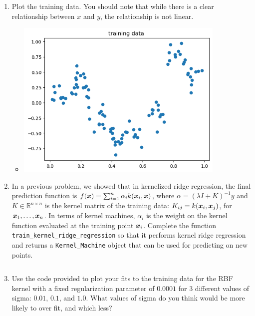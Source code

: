\documentclass{article}
\theoremstyle{plain}
\theoremstyle{definition}
\begin{document}
\begin{enumerate}
  \setcounter{enumi}{\value{saveenum}}
\item Plot the training data. You should note that while there is a clear
relationship between $x$ and $y$, the relationship is not linear.
\begin{itemize}
    \color{blue}
    \item \includegraphics[width=10cm]{homework/homework_3/immages/question_25_1.png}
\end{itemize}

\item In a previous problem, we showed that in kernelized ridge regression,
the final prediction function is $f(\boldsymbol{x})=\sum_{i=1}^{n}\alpha_{i}k(\boldsymbol{x}_{i},\boldsymbol{x})$,
where $\alpha=(\lambda I+K)^{-1}y$ and $K\in\mathbb{R}^{n\times n}$
is the kernel matrix of the training data: $K_{ij}=k(\boldsymbol{x}_{i},\boldsymbol{x}_{j})$,
for $\boldsymbol{x}_{1},\ldots, \boldsymbol{x}_{n}$. In terms of kernel machines, $\alpha_{i}$
is the weight on the kernel function evaluated at the training point
$\boldsymbol{x}_{i}$. Complete the function \texttt{train\_kernel\_ridge\_regression}
so that it performs kernel ridge regression and returns a \texttt{Kernel\_Machine}
object that can be used for predicting on new points. 
\begin{itemize}
    \color{blue}
      \inputminted[firstline=481, lastline=505, breaklines=True]{python}{hw_3.py}
\end{itemize}



\item Use the code provided to plot your fits to the training data for the
RBF kernel with a fixed regularization parameter of $0.0001$ for
3 different values of sigma: $0.01$, $0.1$, and $1.0$. What values
of sigma do you think would be more likely to over fit, and which
less? \\


\end{enumerate}
\end{document}
